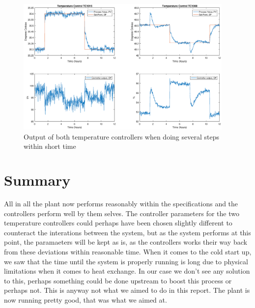 \begin{figure}[ht!]
	\centering
	\includegraphics[width=0.95\textwidth]{fig/results/12h_steps_best.eps}
	\caption{Output of both temperature controllers when doing several steps within short time}
	\label{fig:12h_steps}
\end{figure}

\clearpage
\section{Summary}
All in all the plant now performs reasonably within the specifications and the controllers perform well by them selves. The controller parameters for the two temperature controllers could perhaps have been chosen slightly different to counteract the interations between the system, but as the system performs at this point, the paramaeters will be kept as is, as the controllers works their way back from these deviations within reasonable time. When it comes to the cold start up, we saw that the time until the system is properly running is long due to physical limitations when it comes to heat exchange. In our case we don't see any solution to this, perhaps something could be done upstream to boost this process or perhaps not. This is anyway not what we aimed to do in this report. The plant is now running pretty good, that was what we aimed at.